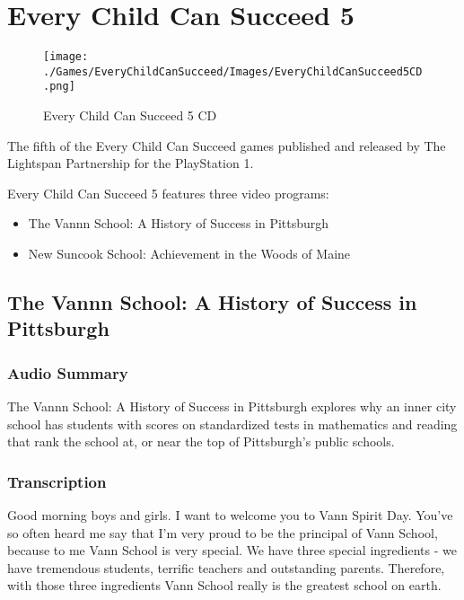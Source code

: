 \chapter{Every Child Can Succeed 5}

\begin{figure}[H]
    \centering
    \texttt{[image: ./Games/EveryChildCanSucceed/Images/EveryChildCanSucceed5CD.png]}
    \caption{Every Child Can Succeed 5 CD}
\end{figure}

The fifth of the Every Child Can Succeed games published and released by The Lightspan Partnership for the PlayStation 1.

Every Child Can Succeed 5 features three video programs:

\begin{itemize}
    \item The Vannn School: A History of Success in Pittsburgh
    \item New Suncook School: Achievement in the Woods of Maine
\end{itemize}

\clearpage
\newpage

\section{The Vannn School: A History of Success in Pittsburgh}

\subsection{Audio Summary}

The Vannn School: A History of Success in Pittsburgh explores why an inner city school has students with scores on standardized tests in mathematics and reading that rank the school at, or near the top of Pittsburgh's public schools.

\subsection{Transcription}

Good morning boys and girls. I want to welcome you to Vann Spirit Day. You've so often heard me say that I'm very proud to be the principal of Vann School, because to me Vann School is very special. We have three special ingredients - we have tremendous students, terrific teachers and outstanding parents. Therefore, with those three ingredients Vann School really is the greatest school on earth.

